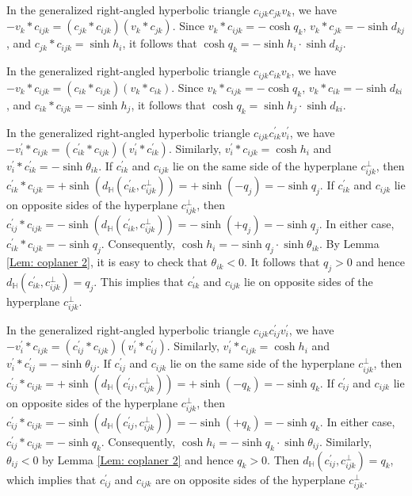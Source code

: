 \documentclass[12pt]{amsart}
\theoremstyle{definition}
\begin{document}
\begin{description}
In the generalized right-angled hyperbolic triangle $c_{ijk}c_{jk}v_k$,
we have $-v_k\ast c_{ijk}=(c_{jk}\ast c_{ijk})(v_k\ast c_{jk})$.
Since $v_k\ast c_{ijk}=-\cosh q_k$,
$v_k\ast c_{jk}=-\sinh d_{kj}$,
and $c_{jk}\ast c_{ijk}=\sinh h_i$,
it follows that $\cosh q_k=-\sinh h_i\cdot \sinh d_{kj}$.

In the generalized right-angled hyperbolic triangle $c_{ijk}c_{ik}v_k$,
we have $-v_k\ast c_{ijk}=(c_{ik}\ast c_{ijk})(v_k\ast c_{ik})$.
Since $v_k\ast c_{ijk}=-\cosh q_k$,
$v_k\ast c_{ik}=-\sinh d_{ki}$, and
$c_{ik}\ast c_{ijk}=-\sinh h_j$,
it follows that $\cosh q_k=\sinh h_j\cdot\sinh d_{ki}$.

In the generalized right-angled hyperbolic triangle $c_{ijk}c^\prime_{ik}v^\prime_i$,
we have $-v^\prime_i\ast c_{ijk}=(c^\prime_{ik}\ast c_{ijk})(v^\prime_i\ast c^\prime_{ik})$.
Similarly, $v^\prime_i\ast c_{ijk}=\cosh h_i$ and
$v^\prime_i\ast c^\prime_{ik}=-\sinh \theta_{ik}$.
If $c^\prime_{ik}$ and $c_{ijk}$ lie on the same side of the hyperplane $c_{ijk}^\bot$,
then $c^\prime_{ik}\ast c_{ijk}=+\sinh(d_\mathbb{H}(c^\prime_{ik},c_{ijk}^\bot))
=+\sinh (-q_j)=-\sinh q_j$.
If $c^\prime_{ik}$ and $c_{ijk}$ lie on opposite sides of the hyperplane $c_{ijk}^\bot$, then $c^\prime_{ij}\ast c_{ijk}=-\sinh(d_\mathbb{H}(c^\prime_{ik},c_{ijk}^\bot))
=-\sinh (+q_j)=-\sinh q_j$.
In either case, $c^\prime_{ik}\ast c_{ijk}=-\sinh q_j$.
Consequently, $\cosh h_i=-\sinh q_j\cdot\sinh \theta_{ik}$.
By Lemma \ref{Lem: coplaner 2}, it is easy to check that $\theta_{ik}<0$.
It follows that $q_j>0$ and hence $d_\mathbb{H}(c^\prime_{ik},c_{ijk}^\bot)=q_j$.
This implies that $c^\prime_{ik}$ and $c_{ijk}$ lie on opposite sides of the hyperplane $c_{ijk}^\bot$.

In the generalized right-angled hyperbolic triangle $c_{ijk}c^\prime_{ij}v^\prime_i$,
we have $-v^\prime_i\ast c_{ijk}=(c^\prime_{ij}\ast c_{ijk})(v^\prime_i\ast c^\prime_{ij})$.
Similarly, $v^\prime_i\ast c_{ijk}=\cosh h_i$ and $v^\prime_i\ast c^\prime_{ij}=-\sinh \theta_{ij}$.
If $c^\prime_{ij}$ and $c_{ijk}$ lie on the same side of the hyperplane $c_{ijk}^\bot$,
then $c^\prime_{ij}\ast c_{ijk}=+\sinh(d_\mathbb{H}(c^\prime_{ij},c_{ijk}^\bot))
=+\sinh (-q_k)=-\sinh q_k$.
If $c^\prime_{ij}$ and $c_{ijk}$ lie on opposite sides of the hyperplane $c_{ijk}^\bot$, then $c^\prime_{ij}\ast c_{ijk}=-\sinh(d_\mathbb{H}(c^\prime_{ij},c_{ijk}^\bot))
=-\sinh (+q_k)=-\sinh q_k$.
In either case, $c^\prime_{ij}\ast c_{ijk}=-\sinh q_k$.
Consequently, $\cosh h_i=-\sinh q_k\cdot\sinh \theta_{ij}$.
Similarly, $\theta_{ij}<0$ by Lemma \ref{Lem: coplaner 2} and hence $q_k>0$.
Then $d_\mathbb{H}(c^\prime_{ij},c_{ijk}^\bot)=q_k$, which implies that $c^\prime_{ij}$ and $c_{ijk}$ are on opposite sides of the hyperplane $c_{ijk}^\bot$.


\end{description}
\end{document}
